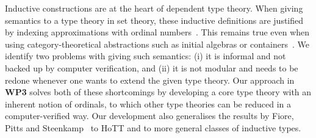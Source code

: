 \documentclass[a4paper,11pt]{article}
\let\oldcite\cite
\renewcommand*\cite[1]{{\protect\NoHyper\oldcite{#1}\protect\endNoHyper}}
\begin{document}
Inductive constructions are at the heart of dependent type theory. When giving semantics to a type theory in set theory, these inductive definitions are justified by indexing approximations with ordinal numbers~\cite{aczelinductive}.
This remains true even when using category-theoretical abstractions such as initial algebras or containers~\cite{abb-alt-gha:containers}.
%
We identify two problems with giving such semantics: (i) it is informal and not backed up by computer verification, and (ii) it is not modular and needs to be redone whenever one wants to extend the given type theory.
%
Our approach in \textbf{WP3} solves both of these shortcomings by developing a core type theory with an inherent notion of ordinals, to which other type theories can be reduced in a computer-verified way.
%
Our development also generalises the results by Fiore, Pitts and Steenkamp~\cite{FiorePittsSteenkamp2022} to HoTT and to more general classes of inductive types. %



%
\end{document}
